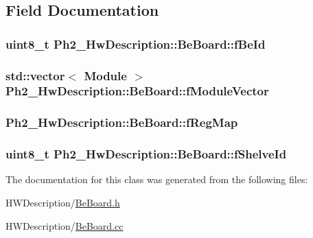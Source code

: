 \subsection{Field Documentation}
\hypertarget{class_ph2___hw_description_1_1_be_board_aabe1a515a23ff8813d4641293a8b4ba1}{
\subsubsection[{f\-Be\-Id}]{\setlength{\rightskip}{0pt plus 5cm}uint8\-\_\-t Ph2\-\_\-\-Hw\-Description\-::\-Be\-Board\-::f\-Be\-Id}}\label{class_ph2___hw_description_1_1_be_board_aabe1a515a23ff8813d4641293a8b4ba1}
\hypertarget{class_ph2___hw_description_1_1_be_board_adcee78870a20c92fc8c060ff709a4baf}{
\subsubsection[{f\-Module\-Vector}]{\setlength{\rightskip}{0pt plus 5cm}std\-::vector$<$ {\bf Module} $>$ Ph2\-\_\-\-Hw\-Description\-::\-Be\-Board\-::f\-Module\-Vector\hspace{0.3cm}{\ttfamily [protected]}}}\label{class_ph2___hw_description_1_1_be_board_adcee78870a20c92fc8c060ff709a4baf}
\hypertarget{class_ph2___hw_description_1_1_be_board_a6db4850485715c0f23c97c3d621a781b}{
\subsubsection[{f\-Reg\-Map}]{ Ph2\-\_\-\-Hw\-Description\-::\-Be\-Board\-::f\-Reg\-Map\hspace{0.3cm}{\ttfamily [protected]}}}\label{class_ph2___hw_description_1_1_be_board_a6db4850485715c0f23c97c3d621a781b}
\hypertarget{class_ph2___hw_description_1_1_be_board_a8e45d863c0a596466a78fd3e16ef92d1}{
\subsubsection[{f\-Shelve\-Id}]{\setlength{\rightskip}{0pt plus 5cm}uint8\-\_\-t Ph2\-\_\-\-Hw\-Description\-::\-Be\-Board\-::f\-Shelve\-Id}}\label{class_ph2___hw_description_1_1_be_board_a8e45d863c0a596466a78fd3e16ef92d1}


The documentation for this class was generated from the following files\-:\begin{DoxyCompactItemize}
\item 
H\-W\-Description/\hyperlink{_be_board_8h}{Be\-Board.\-h}\item 
H\-W\-Description/\hyperlink{_be_board_8cc}{Be\-Board.\-cc}\end{DoxyCompactItemize}
